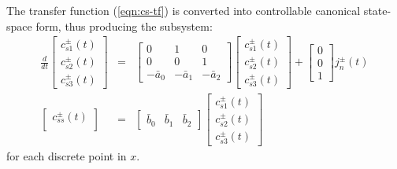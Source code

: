 \documentclass[12pt]{article}
\begin{document}
The transfer function (\ref{eqn:cs-tf}) is converted into controllable canonical state-space form, thus producing the subsystem:
\begin{eqnarray}
\frac{d}{dt}
\left[
\begin{array}{c}
 c_{s1}^{\pm}(t) \\
 c_{s2}^{\pm}(t) \\
 c_{s3}^{\pm}(t)
\end{array}
\right]
&=&
\left[
\begin{array}{ccc}
 0 & 1  & 0  \\
 0 & 0  & 1  \\
 -\bar{a}_0 & -\bar{a}_1  & -\bar{a}_2  
\end{array}
\right]
\left[
\begin{array}{c}
 c_{s1}^{\pm}(t) \\
 c_{s2}^{\pm}(t) \\
 c_{s3}^{\pm}(t)
\end{array}
\right] + 
\left[
\begin{array}{c}
 0 \\
 0 \\
 1
\end{array} \label{eqn:cs-ss-cc1}
\right] j_{n}^{\pm}(t) \\
\left[
\begin{array}{c}
 c_{ss}^{\pm}(t) \\
\end{array}
\right] &=& 
\left[
\begin{array}{ccc}
 \bar{b}_0 & \bar{b}_1  & \bar{b}_2
\end{array}
\right]
\left[
\begin{array}{c}
 c_{s1}^{\pm}(t) \\
 c_{s2}^{\pm}(t) \\
 c_{s3}^{\pm}(t)
\end{array}
\right] \label{eqn:cs-ss-cc2}
\end{eqnarray}
for each discrete point in $x$.
\end{document}
